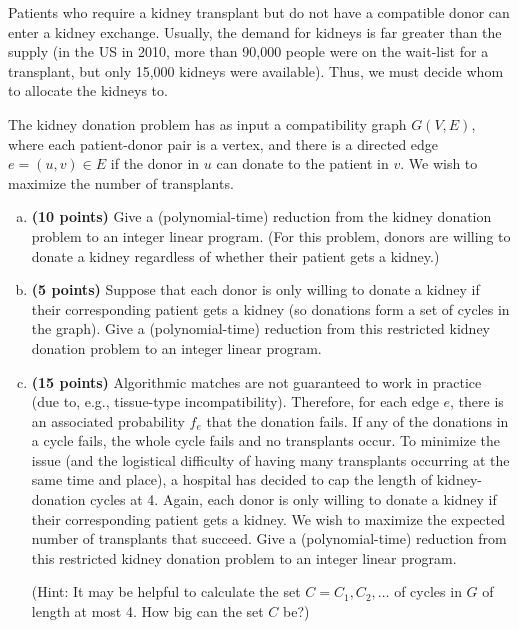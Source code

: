 \documentclass[11pt,letterpaper]{article}
\begin{document}
\pagebreak
\begin{problem}
    Patients who require a kidney transplant but do not have a compatible donor can enter a kidney exchange. Usually, the demand for kidneys is far greater than the supply (in the US in 2010, more than 90,000 people were on the wait-list for a transplant, but only 15,000 kidneys were available). Thus, we must decide whom to allocate the kidneys to.

    The kidney donation problem has as input a compatibility graph $G(V, E)$, where each patient-donor pair is a vertex, and there is a directed edge $e = (u, v) \in E$ if the donor in $u$ can donate to the patient in $v.$ We wish to maximize the number of transplants.

    \begin{enumerate}[(a)]
        \item {\bf (10 points)} Give a (polynomial-time) reduction from the kidney donation problem to an integer linear program. (For this problem, donors are willing to donate a kidney regardless of whether their patient gets a kidney.)

        \item {\bf (5 points)} Suppose that each donor is only willing to donate a kidney if their corresponding patient gets a kidney (so donations form a set of cycles in the graph). Give a (polynomial-time) reduction from this restricted kidney donation problem to an integer linear program.

        \item {\bf (15 points)} Algorithmic matches are not guaranteed to work in practice (due to, e.g., tissue-type incompatibility). Therefore, for each edge $e$, there is an associated probability $f_e$ that the donation fails. If any of the donations in a cycle fails, the whole cycle fails and no transplants occur. To minimize the issue (and the logistical difficulty of having many transplants occurring at the same time and place), a hospital has decided to cap the length of kidney-donation cycles at 4. Again, each donor is only willing to donate a kidney if their corresponding patient gets a kidney. We wish to maximize the expected number of transplants that succeed. Give a (polynomial-time) reduction from this restricted kidney donation problem to an integer linear program.

        (Hint: It may be helpful to calculate the set $C = {C_1, C_2, \ldots}$ of cycles in $G$ of length at most 4. How big can the set $C$ be?)
\end{enumerate}
\end{problem}
\end{document}
